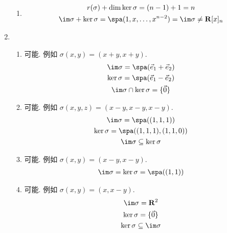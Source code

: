 \begin{enumerate}
\begin{enumerate}
              \item \begin{gather*}
                        r(\sigma) + \dim \ker \sigma = (n - 1) + 1 = n \\
                        \im \sigma + \ker \sigma = \spa(1, x, \ldots, x^{n - 2}) = \im \sigma \neq \mathbf{R}[x]_n
                    \end{gather*}
          \end{enumerate}

    \item \begin{enumerate}
              \item 可能. 例如 $ \sigma(x, y) = (x + y, x + y) $.
                    \begin{gather*}
                        \im \sigma = \spa(\vec{e}_1 + \vec{e}_2) \\
                        \ker \sigma = \spa(\vec{e}_1 - \vec{e}_2) \\
                        \im \sigma \cap \ker \sigma = \{\vec{0}\}
                    \end{gather*}

              \item 可能. 例如 $ \sigma(x, y, z) = (x - y, x - y, x - y) $.
                    \begin{gather*}
                        \im \sigma = \spa((1, 1, 1)) \\
                        \ker \sigma = \spa((1, 1, 1), (1, 1, 0)) \\
                        \im \sigma \subseteq \ker \sigma
                    \end{gather*}

              \item 可能. 例如 $ \sigma(x, y) = (x - y, x - y) $.
                    \begin{gather*}
                        \im \sigma = \ker \sigma = \spa((1, 1))
                    \end{gather*}

              \item 可能. 例如 $ \sigma(x, y) = (x, x - y) $.
                    \begin{gather*}
                        \im \sigma = \mathbf{R}^2 \\
                        \ker \sigma = \{\vec{0}\} \\
                        \ker \sigma \subseteq \im \sigma
                    \end{gather*}
          \end{enumerate}


\end{enumerate}
